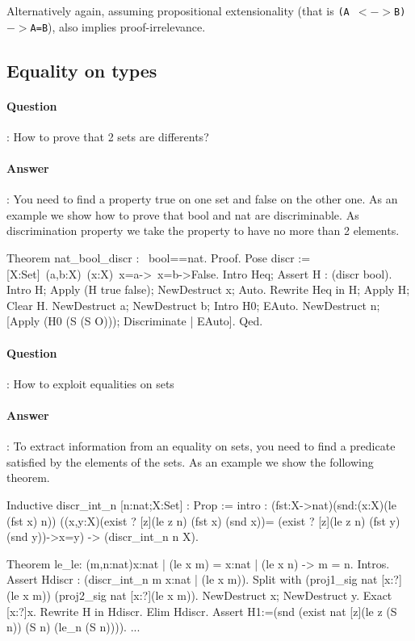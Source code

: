 \documentclass{article}
\newcommand{\coqtt}[1]{{\tt #1}}
\newcommand{\coqimp}{{$->$}}
\newcommand{\coqequiv}{{$<->$}}
\begin{document}
  Alternatively again, assuming propositional extensionality (that is
  \coqtt{(A \coqequiv B) \coqimp A=B}), also implies proof-irrelevance.

\subsection{Equality on types}

\paragraph{Question}: How to prove that 2 sets are differents?

\paragraph{Answer}: You need to find a property true on one set and false on
the other one. As an example we show how to prove that bool and nat are
discriminable. As discrimination property we take the property to have
no more than 2 elements.

\begin{coq_example*}
Theorem nat_bool_discr : ~bool==nat.
Proof.
  Pose discr := [X:Set]~(a,b:X)~(x:X)~x=a->~x=b->False.
  Intro Heq; Assert H : (discr bool).
    Intro H; Apply (H true false); NewDestruct x; Auto.
  Rewrite Heq in H; Apply H; Clear H.
  NewDestruct a; NewDestruct b; Intro H0; EAuto.
  NewDestruct n; [Apply (H0 (S (S O))); Discriminate | EAuto].
Qed.
\end{coq_example*}

\paragraph{Question}: How to exploit equalities on sets

\paragraph{Answer}: To extract information from an equality on sets, you need to find a
predicate satisfied by the elements of the sets. As an example we show
the following theorem.

\begin{coq_example*}
Inductive discr_int_n [n:nat;X:Set] : Prop :=
  intro : (fst:X->nat)(snd:(x:X)(le (fst x) n))
            ((x,y:X)(exist ? [z](le z n) (fst x) (snd x))=
                (exist ? [z](le z n) (fst y) (snd y))->x=y)
          -> (discr_int_n n X).

Theorem le_le: (m,n:nat){x:nat | (le x m)} = {x:nat | (le x n)} -> m = n.
Intros.
Assert Hdiscr : (discr_int_n m {x:nat | (le x m)}).
Split with (proj1_sig nat [x:?](le x m)) (proj2_sig nat [x:?](le x m)).
NewDestruct x; NewDestruct y.
Exact [x:?]x.
Rewrite H in Hdiscr.
Elim Hdiscr.
Assert H1:=(snd (exist nat [z](le z (S n)) (S n) (le_n (S n)))).
...
\end{coq_example*}
\end{document}
